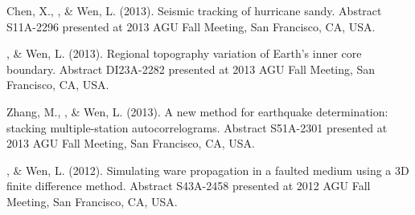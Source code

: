 \begin{etaremune}
    Chen, X., \Tian, \& Wen, L. (2013).
    Seismic tracking of hurricane sandy.
    Abstract S11A-2296 presented at 2013 AGU Fall Meeting, San Francisco, CA, USA.
\item
    \Tian, \& Wen, L. (2013).
    Regional topography variation of Earth's inner core boundary.
    Abstract DI23A-2282 presented at 2013 AGU Fall Meeting, San Francisco, CA, USA.
\item
    Zhang, M., \Tian, \& Wen, L. (2013).
    A new method for earthquake determination: stacking multiple-station autocorrelograms.
    Abstract S51A-2301 presented at 2013 AGU Fall Meeting, San Francisco, CA, USA.
\item
    \Tian, \& Wen, L. (2012).
    Simulating ware propagation in a faulted medium using a 3D finite difference method.
    Abstract S43A-2458 presented at 2012 AGU Fall Meeting, San Francisco, CA, USA.
\end{etaremune}

